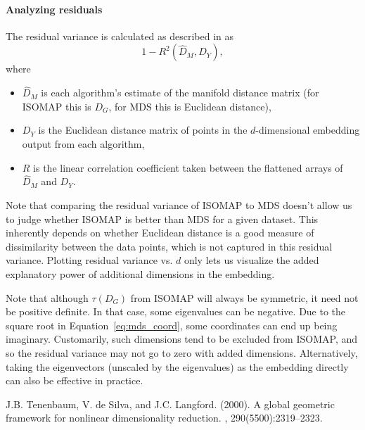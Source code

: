 \documentclass[11pt]{article}
\begin{document}
\paragraph{Analyzing residuals}

The residual variance is calculated as described in \cite{isomap} as
$$1-R^2(\hat D_M, D_Y),$$
where
\begin{itemize}
	\item $\hat D_M$ is each algorithm's estimate of the manifold distance matrix (for ISOMAP this is $D_G$, for MDS this is Euclidean distance),
	\item $D_Y$ is the Euclidean distance matrix of points in the $d$-dimensional embedding output from each algorithm,
	\item $R$ is the linear correlation coefficient taken between the flattened arrays of $\hat D_M$ and $D_Y$.
\end{itemize}
Note that comparing the residual variance of ISOMAP to MDS doesn't allow us to judge whether ISOMAP is better than MDS for a given dataset. This inherently depends on whether Euclidean distance is a good measure of dissimilarity between the data points, which is not captured in this residual variance. Plotting residual variance vs. $d$ only lets us visualize the added explanatory power of additional dimensions in the embedding.

Note that although $\tau(D_G)$ from ISOMAP will always be symmetric, it need not be positive definite. In that case, some eigenvalues can be negative. Due to the square root in Equation~\ref{eq:mds_coord}, some coordinates can end up being imaginary. Customarily, such dimensions tend to be excluded from ISOMAP, and so the residual variance may not go to zero with added dimensions. Alternatively, taking the eigenvectors (unscaled by the eigenvalues) as the embedding directly can also be effective in practice.


\begin{thebibliography}{}
	
	J.B. Tenenbaum, V. de Silva, and J.C. Langford. (2000).
	\newblock A global geometric framework for nonlinear
	dimensionality reduction.
	, 290(5500):2319–2323.

\end{thebibliography}
\end{document}
